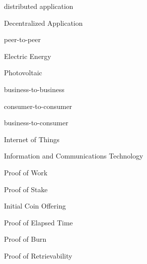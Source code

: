 {distributed application}

{Decentralized Application}

{peer-to-peer}

{}

{}

{}

{}

{Electric Energy}

{}

{Photovoltaic}

{}

{}

{business-to-business}

{consumer-to-consumer}

{business-to-consumer}

{Internet of Things}

{}

{Information and Communications Technology}

{Proof of Work}

{Proof of Stake}

{Initial Coin Offering}

{Proof of Elapsed Time}

{Proof of Burn}

{Proof of Retrievability}

